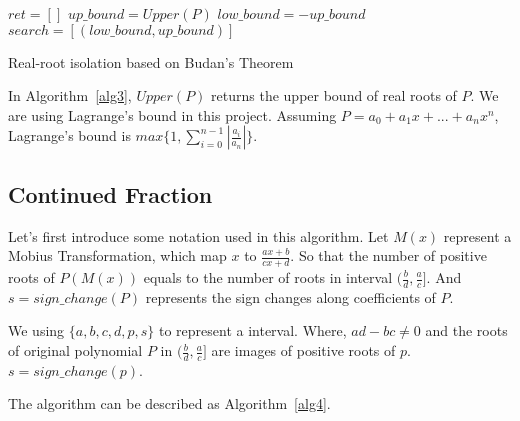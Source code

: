 \begin{algorithm}[H]
\label{alg3}
\SetAlgoLined


  $ret = []$\;
  $up\_bound = Upper(P)$\;
  $low\_bound = - up\_bound$\;
  $search = [(low\_bound, up\_bound)]$\;


  \;
\caption{Real-root isolation based on Budan's Theorem}
\end{algorithm}

In Algorithm~\ref{alg3}, $Upper(P)$ returns the upper bound of real roots of
$P$. We are using Lagrange's bound in this project. Assuming $P = a_0 + a_1x +
... + a_nx^n$, Lagrange's bound is $max\{1,
\sum_{i=0}^{n-1}|\frac{a_i}{a_n}|\}$.

\subsection{Continued Fraction}

Let's first introduce some notation used in this algorithm. Let $M(x)$ represent a
Mobius Transformation, which map $x$ to $\frac{ax+b}{cx+d}$. So that the number
of positive
roots of $P(M(x))$ equals to the number of roots in interval $(\frac{b}{d},
\frac{a}{c}]$. And $s = sign\_change(P)$ represents the sign changes along
coefficients of $P$.

We using $\{a,b,c,d,p, s\}$ to represent a interval. Where, $ad-bc \neq 0$ and
the roots of original polynomial $P$ in $(\frac{b}{d},\frac{a}{c}]$ are images
of positive roots of $p$. $s = sign\_change(p)$.

The algorithm can be described as Algorithm~\ref{alg4}. 

